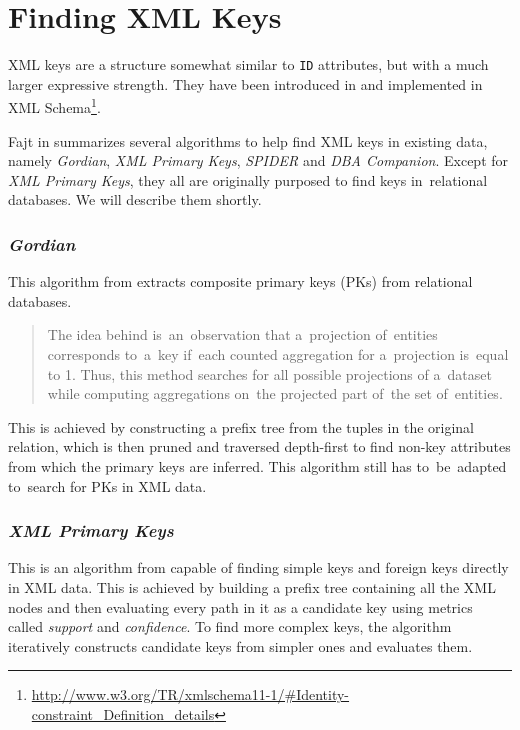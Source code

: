 \section{Finding XML Keys}

XML keys are a structure somewhat similar to \texttt{ID} attributes, but with a much larger expressive strength. They have been introduced in \cite{keX} and implemented in XML Schema\footnote{\url{http://www.w3.org/TR/xmlschema11-1/\#Identity-constraint\_Definition\_details}}.

Fajt in \cite{fajt} summarizes several algorithms to help find XML keys in existing data, namely \textit{Gordian}, \textit{XML Primary Keys}, \textit{SPIDER} and \textit{DBA Companion}. Except for \textit{XML Primary Keys}, they all are originally purposed to find keys in~relational databases. We will describe them shortly.

\subsubsection{\textit{Gordian}}

This algorithm from \cite{fajt-41} extracts composite primary keys (PKs) from relational databases.

\begin{quote}
The idea behind is~an~observation that a~projection of~entities corresponds to~a~key if~each counted aggregation for a~projection is~equal to 1. Thus, this method searches for all possible projections of a~data\-set while computing aggregations on~the projected part of~the set of~entities.
\end{quote}

This is achieved by constructing a prefix tree from the tuples in the original relation, which is then pruned and traversed depth-first to find non-key attributes from which the primary keys are inferred. This algorithm still has to~be~adapted to~search for PKs in XML data.

\subsubsection{\textit{XML Primary Keys}}

This is an algorithm from \cite{fajt-39} capable of finding simple keys and foreign keys directly in XML data. This is achieved by building a prefix tree containing all the XML nodes and then evaluating every path in it as a candidate key using metrics called \textit{support} and \textit{confidence}. To find more complex keys, the algorithm iteratively constructs candidate keys from simpler ones and evaluates them.\\

